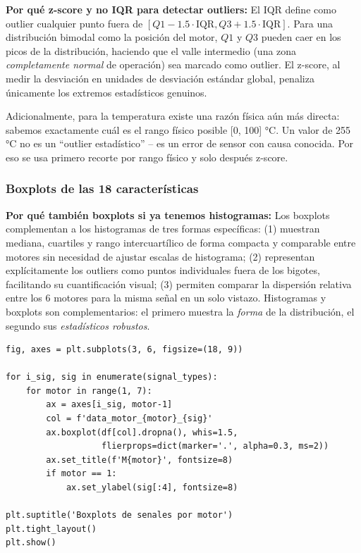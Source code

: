 \documentclass[12pt,a4paper]{article}
\begin{document}
\begin{notebox}
\textbf{Por qué z-score y no IQR para detectar outliers:}
El IQR define como outlier cualquier punto fuera de $[Q1 - 1.5 \cdot \text{IQR},
Q3 + 1.5 \cdot \text{IQR}]$. Para una distribución bimodal como la posición del motor,
$Q1$ y $Q3$ pueden caer en los picos de la distribución, haciendo que el valle intermedio
(una zona \emph{completamente normal} de operación) sea marcado como outlier.
El z-score, al medir la desviación en unidades de desviación estándar global,
penaliza únicamente los extremos estadísticos genuinos.

Adicionalmente, para la temperatura existe una razón física aún más directa: sabemos
exactamente cuál es el rango físico posible [0, 100] °C. Un valor de 255 °C no es
un ``outlier estadístico'' -- es un error de sensor con causa conocida. Por eso se
usa primero recorte por rango físico y solo después z-score.
\end{notebox}

\subsubsection{Boxplots de las 18 características}

\begin{whybox}
\textbf{Por qué también boxplots si ya tenemos histogramas:}
Los boxplots complementan a los histogramas de tres formas específicas:
(1) muestran mediana, cuartiles y rango intercuartílico de forma compacta y
comparable entre motores sin necesidad de ajustar escalas de histograma;
(2) representan explícitamente los outliers como puntos individuales fuera
de los bigotes, facilitando su cuantificación visual; (3) permiten comparar
la dispersión relativa entre los 6 motores para la misma señal en un solo
vistazo. Histogramas y boxplots son complementarios: el primero muestra la
\emph{forma} de la distribución, el segundo sus \emph{estadísticos robustos}.
\end{whybox}

\begin{lstlisting}[caption={Generación de boxplots de las 18 características}, label={lst:boxplot}]
fig, axes = plt.subplots(3, 6, figsize=(18, 9))

for i_sig, sig in enumerate(signal_types):
    for motor in range(1, 7):
        ax = axes[i_sig, motor-1]
        col = f'data_motor_{motor}_{sig}'
        ax.boxplot(df[col].dropna(), whis=1.5,
                   flierprops=dict(marker='.', alpha=0.3, ms=2))
        ax.set_title(f'M{motor}', fontsize=8)
        if motor == 1:
            ax.set_ylabel(sig[:4], fontsize=8)

plt.suptitle('Boxplots de senales por motor')
plt.tight_layout()
plt.show()
\end{lstlisting}
\end{document}
